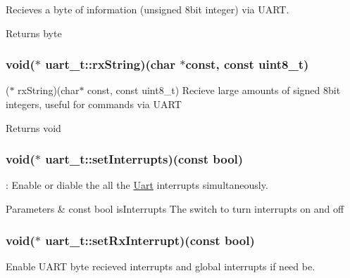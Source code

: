 Recieves a byte of information (unsigned 8bit integer) via U\-A\-R\-T. 

\begin{DoxyReturn}{Returns}
byte 
\end{DoxyReturn}
\hypertarget{a00018_gafb6340cda56aa27bc772e4ceec334c82}{
\subsubsection[{rx\-String}]{\setlength{\rightskip}{0pt plus 5cm}void($\ast$  uart\-\_\-t\-::rx\-String)(char $\ast$const, const uint8\-\_\-t)}}\label{a00018_gafb6340cda56aa27bc772e4ceec334c82}


($\ast$ rx\-String)(char$\ast$ const, const uint8\-\_\-t) Recieve large amounts of signed 8bit integers, useful for commands via U\-A\-R\-T 

\begin{DoxyReturn}{Returns}
void 
\end{DoxyReturn}
\hypertarget{a00018_gac87718fed4c53bd319218fe925e52d14}{
\subsubsection[{set\-Interrupts}]{\setlength{\rightskip}{0pt plus 5cm}void($\ast$ uart\-\_\-t\-::set\-Interrupts)(const bool)}}\label{a00018_gac87718fed4c53bd319218fe925e52d14}


\-: Enable or diable the all the \hyperlink{a00009}{Uart} interrupts simultaneously. 


\begin{DoxyParams}{Parameters}
{\em } & const bool is\-Interrupts The switch to turn interrupts on and off \\
\hline
\end{DoxyParams}
\hypertarget{a00018_gadc49d7eacb5b108a10e3a940bd2db9b7}{
\subsubsection[{set\-Rx\-Interrupt}]{\setlength{\rightskip}{0pt plus 5cm}void($\ast$ uart\-\_\-t\-::set\-Rx\-Interrupt)(const bool)}}\label{a00018_gadc49d7eacb5b108a10e3a940bd2db9b7}


Enable U\-A\-R\-T byte recieved interrupts and global interrupts if need be. 


